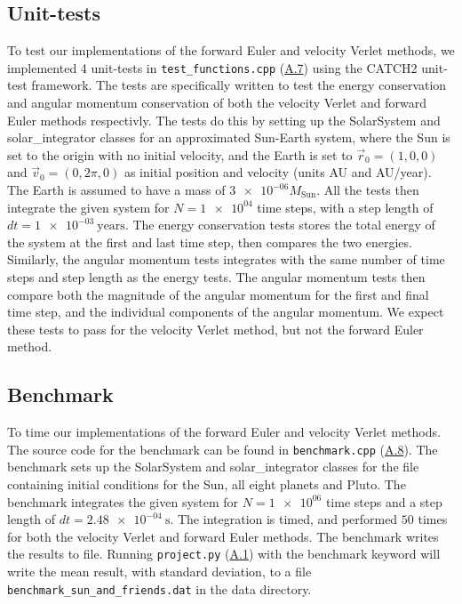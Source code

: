 \documentclass[reprint,english,notitlepage]{revtex4-1}  %
\begin{document}
\subsection{Unit-tests} \label{sec:III:d}
To test our implementations of the forward Euler and velocity Verlet methods, we implemented 4 unit-tests in \verb+test_functions.cpp+ (\hyperref[A.7]{A.7}) using the CATCH2 unit-test framework. The tests are specifically written to test the energy conservation and angular momentum conservation of both the velocity Verlet and forward Euler methods respectivly. The tests do this by setting up the SolarSystem and solar\_integrator classes for an approximated Sun-Earth system, where the Sun is set to the origin with no initial velocity, and the Earth is set to \(\vec{r}_{0} = (1, 0, 0)\) and \(\vec{v}_{0} = (0, 2\pi, 0)\) as initial position and velocity (units AU and AU/year). The Earth is assumed to have a mass of \(\num{3e-06}M_\text{Sun}\). All the tests then integrate the given system for \(N=\num{1e+04}\) time steps, with a step length of \(dt = \SI{1e-03}{\text{years}}\). The energy conservation tests stores the total energy of the system at the first and last time step, then compares the two energies. Similarly, the angular momentum tests integrates with the same number of time steps and step length as the energy tests. The angular momentum tests then compare both the magnitude of the angular momentum for the first and final time step, and the individual components of the angular momentum. We expect these tests to pass for the velocity Verlet method, but not the forward Euler method.

\subsection{Benchmark} \label{sec:III:e}
To time our implementations of the forward Euler and velocity Verlet methods. The source code for the benchmark can be found in \verb+benchmark.cpp+ (\hyperref[A.8]{A.8}). The benchmark sets up the SolarSystem and solar\_integrator classes for the file containing initial conditions for the Sun, all eight planets and Pluto. The benchmark integrates the given system for \(N = \num{1e+06}\) time steps and a step length of \(dt = \SI{2.48e-04}{\second}\). The integration is timed, and performed \(50\) times for both the velocity Verlet and forward Euler methods. The benchmark writes the results to file. Running \verb+project.py+ (\hyperref[A.1]{A.1}) with the benchmark keyword will write the mean result, with standard deviation, to a file \verb+benchmark_sun_and_friends.dat+ in the data directory.
\end{document}
